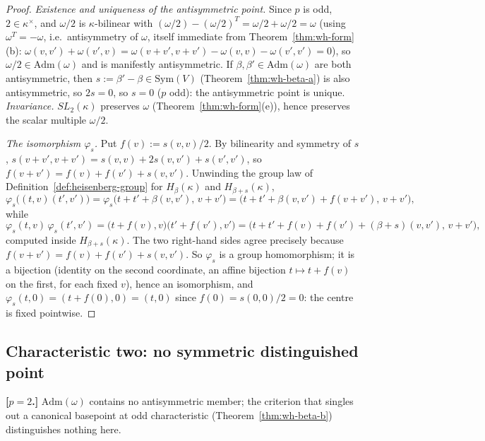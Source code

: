 \begin{proof}
\emph{Existence and uniqueness of the antisymmetric point.} Since $p$ is odd,
$2\in\kappa^\times$, and $\omega/2$ is $\kappa$-bilinear with
$(\omega/2)-(\omega/2)^T = \omega/2+\omega/2=\omega$ (using
$\omega^T=-\omega$, i.e.\ antisymmetry of $\omega$, itself immediate from
Theorem~\ref{thm:wh-form}(b): $\omega(v,v')+\omega(v',v)=\omega(v+v',v+v')-\omega(v,v)-\omega(v',v')=0$),
so $\omega/2\in\mathrm{Adm}(\omega)$ and is manifestly antisymmetric. If
$\beta,\beta'\in\mathrm{Adm}(\omega)$ are both antisymmetric, then
$s:=\beta'-\beta\in\mathrm{Sym}(V)$ (Theorem~\ref{thm:wh-beta-a}) is also
antisymmetric, so $2s=0$, so $s=0$ ($p$ odd): the antisymmetric point is
unique. \emph{Invariance.} $SL_2(\kappa)$ preserves $\omega$
(Theorem~\ref{thm:wh-form}(e)), hence preserves the scalar multiple
$\omega/2$.

\emph{The isomorphism $\varphi_s$.} Put $f(v):=s(v,v)/2$. By bilinearity and
symmetry of $s$, $s(v+v',v+v')=s(v,v)+2s(v,v')+s(v',v')$, so
$f(v+v')=f(v)+f(v')+s(v,v')$. Unwinding the group law of
Definition~\ref{def:heisenberg-group} for $H_\beta(\kappa)$ and
$H_{\beta+s}(\kappa)$,
\[
\varphi_s\big((t,v)(t',v')\big) = \varphi_s\big(t+t'+\beta(v,v'),\,v+v'\big)
= \big(t+t'+\beta(v,v')+f(v+v'),\,v+v'\big),
\]
while
\[
\varphi_s(t,v)\,\varphi_s(t',v') = \big(t+f(v),v\big)\big(t'+f(v'),v'\big)
= \big(t+t'+f(v)+f(v')+(\beta{+}s)(v,v'),\,v+v'\big),
\]
computed inside $H_{\beta+s}(\kappa)$. The two right-hand sides agree
precisely because $f(v+v')=f(v)+f(v')+s(v,v')$. So $\varphi_s$ is a group
homomorphism; it is a bijection (identity on the second coordinate, an
affine bijection $t\mapsto t+f(v)$ on the first, for each fixed $v$), hence
an isomorphism, and $\varphi_s(t,0)=(t+f(0),0)=(t,0)$ since
$f(0)=s(0,0)/2=0$: the centre is fixed pointwise.
\end{proof}

\subsection{Characteristic two: no symmetric distinguished point}

\statusProvedConditional
\begin{theorem}
\label{thm:wh-beta-c}
\textbf{[$p=2$.]} $\mathrm{Adm}(\omega)$ contains no antisymmetric member;
the criterion that singles out a canonical basepoint at odd characteristic
(Theorem~\ref{thm:wh-beta-b}) distinguishes nothing here.
\end{theorem}

